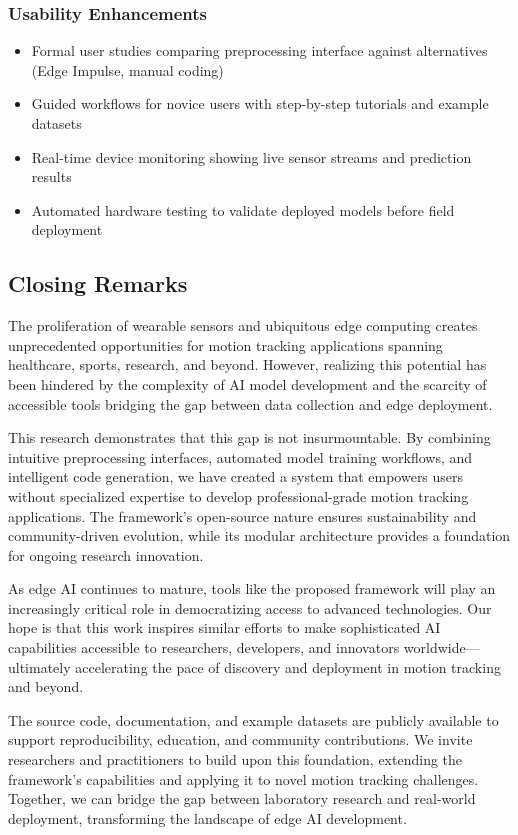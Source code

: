 \subsubsection{Usability Enhancements}
\begin{itemize}
    \item Formal user studies comparing preprocessing interface against alternatives (Edge Impulse, manual coding)
    \item Guided workflows for novice users with step-by-step tutorials and example datasets
    \item Real-time device monitoring showing live sensor streams and prediction results
    \item Automated hardware testing to validate deployed models before field deployment
\end{itemize}

\subsection{Closing Remarks}

The proliferation of wearable sensors and ubiquitous edge computing creates unprecedented opportunities for motion tracking applications spanning healthcare, sports, research, and beyond. However, realizing this potential has been hindered by the complexity of AI model development and the scarcity of accessible tools bridging the gap between data collection and edge deployment.

This research demonstrates that this gap is not insurmountable. By combining intuitive preprocessing interfaces, automated model training workflows, and intelligent code generation, we have created a system that empowers users without specialized expertise to develop professional-grade motion tracking applications. The framework's open-source nature ensures sustainability and community-driven evolution, while its modular architecture provides a foundation for ongoing research innovation.

As edge AI continues to mature, tools like the proposed framework will play an increasingly critical role in democratizing access to advanced technologies. Our hope is that this work inspires similar efforts to make sophisticated AI capabilities accessible to researchers, developers, and innovators worldwide—ultimately accelerating the pace of discovery and deployment in motion tracking and beyond.

The source code, documentation, and example datasets are publicly available to support reproducibility, education, and community contributions. We invite researchers and practitioners to build upon this foundation, extending the framework's capabilities and applying it to novel motion tracking challenges. Together, we can bridge the gap between laboratory research and real-world deployment, transforming the landscape of edge AI development.


